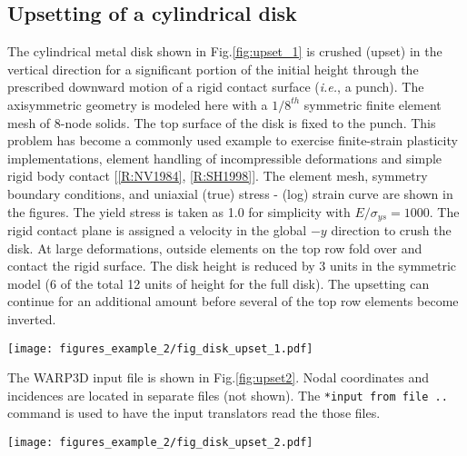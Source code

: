 \documentclass[11pt]{report}
\numberwithin{equation}{section}
\newcommand{\ttt} {\texttt}  %
\newcommand{\ie}{\emph{i.e.},\xspace}
\newcommand{\ti}{\emph}
\newcommand{\Fig}{{Fig.}\xspace}
\newcommand{\nid}{\noindent}
\renewcommand{\thefigure}{\thesection.\arabic{figure}}
\begin{document}
{\subsection{Upsetting of a cylindrical disk}  

\nid The cylindrical metal disk shown in \Fig \ref{fig:upset_1} is crushed (upset) 
in the vertical direction for a significant
portion of the initial height through the prescribed 
downward motion of a rigid contact surface (\ie a punch). The axisymmetric geometry
is modeled here with a $1/8^{th}$ symmetric finite element mesh of 8-node solids. The top surface of the
disk is fixed to the punch. This problem has become a commonly used example to exercise finite-strain
plasticity implementations, element handling of incompressible deformations and simple rigid
body contact [\ref{R:NV1984}, \ref{R:SH1998}]. The element mesh, symmetry boundary conditions,  and
uniaxial (true) stress - (log) strain curve are shown in the figures. The yield stress is taken as 1.0
for simplicity with $E/\sigma_{ys}=1000$. The rigid contact plane
is assigned a velocity in the global $-y$ direction to crush the disk. At large deformations, outside elements
on the top row fold over and contact the rigid surface.  The disk height is reduced by 3
units in the symmetric
model (6 of the total 12 units of height for the full disk). 
The upsetting can continue for an additional
amount before several of the top row elements become inverted.
%
\begin{sidewaysfigure}
\begin{center}
\texttt{[image: figures\_example\_2/fig\_disk\_upset\_1.pdf]} 
\caption{{\small Fig. \thefigure\ Disk upsetting analysis. (a) overall disk geometry, (b) $1/8^{th}$ symmetric FE
model with 8-node brick elements, (c) uniaxial true stress -- log strain curve for material,
(d) imposed punch \ti{vs} time through rigid surface}
\label{fig:upset_1}}
%
\end{center}
\end{sidewaysfigure}
%

The WARP3D input file is shown in \Fig \ref{fig:upset2}. Nodal coordinates and incidences are located in separate files
(not shown). The \ttt{*input from file ..} command is used to have the input translators
read the those files.
%
\begin{sidewaysfigure}
\begin{center}
\texttt{[image: figures\_example\_2/fig\_disk\_upset\_2.pdf]} 
\caption{{\small Fig. \thefigure\ Disk upsetting analysis. (a) input file \ttt{warp3d.inp}
and (b) file of output commands \ttt{get\_output.inp} }
\label{fig:upset2}}
%
\end{center}
\end{sidewaysfigure}
%

}
\end{document}
